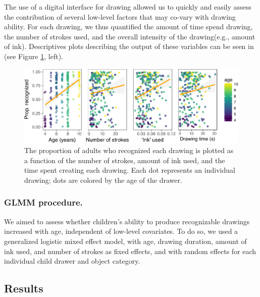 \documentclass[10pt, letterpaper]{article}
\newenvironment{CodeChunk}{}{}
\begin{document}
The use of a digital interface for drawing allowed us to quickly and
easily assess the contribution of several low-level factors that may
co-vary with drawing ability. For each drawing, we thus quantified the
amount of time spend drawing, the number of strokes used, and the
overall intensity of the drawing(e.g., amount of ink). Descriptives
plots describing the output of these variables can be seen in (see
Figure \ref{fig:covDescriptives}, left).

\begin{CodeChunk}
\begin{figure}[h]

{\centering \includegraphics{figs/covDescriptives-1} 

}

\caption[The proportion of adults who recognized each drawing is plotted as a function of the number of strokes, amount of ink used, and the time spent creating each drawing]{The proportion of adults who recognized each drawing is plotted as a function of the number of strokes, amount of ink used, and the time spent creating each drawing. Each dot represents an individual drawing; dots are colored by the age of the drawer.}\label{fig:covDescriptives}
\end{figure}
\end{CodeChunk}

\subsubsection{GLMM procedure.}\label{glmm-procedure.}

We aimed to assess whether children's ability to produce recognizable
drawings increased with age, independent of low-level covariates. To do
so, we used a generalized logistic mixed effect model, with age, drawing
duration, amount of ink used, and number of strokes as fixed effects,
and with random effects for each individual child drawer and object
category.

\subsection{Results}\label{results}
\end{document}
